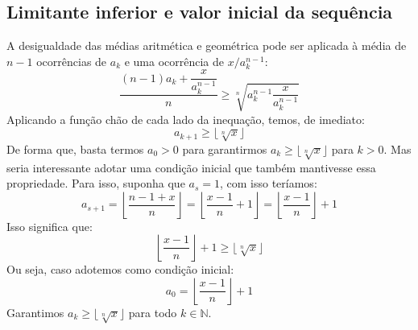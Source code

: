 \subsection*{Limitante inferior e valor inicial da sequência}

A desigualdade das médias aritmética e geométrica
pode ser aplicada à média de $n - 1$ ocorrências de $a_k$
e uma ocorrência de $x/a_k^{n-1}$:
\[
  \dfrac{(n-1) a_k + \dfrac{x}{a_k^{n-1}}}{n} \ge
  \sqrt[n]{a_k^{n-1} \dfrac{x}{a_k^{n-1}}}
\]
Aplicando a função chão de cada lado da inequação, temos, de imediato:
\[
  a_{k+1} \ge \lfloor \sqrt[n]{x} \rfloor
\]
De forma que, basta termos $a_0 > 0$
para garantirmos $a_k \ge \lfloor \sqrt[n]{x} \rfloor$ para $k > 0$.
Mas seria interessante adotar uma condição inicial
que também mantivesse essa propriedade.
Para isso, suponha que $a_s = 1$, com isso teríamos:
\[
  a_{s+1}
  = \left\lfloor \dfrac{n - 1 + x}{n} \right\rfloor
  = \left\lfloor \dfrac{x - 1}{n} + 1 \right\rfloor
  = \left\lfloor \dfrac{x - 1}{n} \right\rfloor + 1
\]
Isso significa que:
\[
  \left\lfloor \dfrac{x - 1}{n} \right\rfloor + 1
  \ge \lfloor \sqrt[n]{x} \rfloor
\]
Ou seja, caso adotemos como condição inicial:
\[
  a_0 = \left\lfloor \dfrac{x - 1}{n} \right\rfloor + 1
\]
Garantimos $a_k \ge \lfloor \sqrt[n]{x} \rfloor$
para todo $k \in \mathds{N}$.
